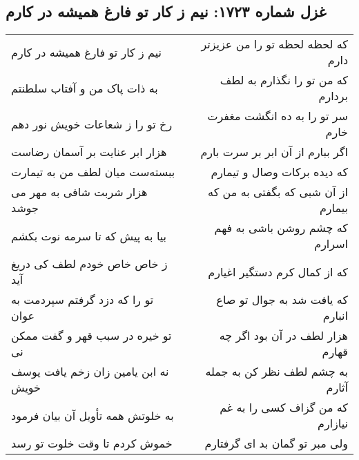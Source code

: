 \begin{center}
\section*{غزل شماره ۱۷۲۳: نیم ز کار تو فارغ همیشه در کارم}
\label{sec:1723}
\begin{longtable}{l p{0.5cm} r}
نیم ز کار تو فارغ همیشه در کارم
&&
که لحظه لحظه تو را من عزیزتر دارم
\\
به ذات پاک من و آفتاب سلطنتم
&&
که من تو را نگذارم به لطف بردارم
\\
رخ تو را ز شعاعات خویش نور دهم
&&
سر تو را به ده انگشت مغفرت خارم
\\
هزار ابر عنایت بر آسمان رضاست
&&
اگر ببارم از آن ابر بر سرت بارم
\\
ببسته‌ست میان لطف من به تیمارت
&&
که دیده برکات وصال و تیمارم
\\
هزار شربت شافی به مهر می جوشد
&&
از آن شبی که بگفتی به من که بیمارم
\\
بیا به پیش که تا سرمه نوت بکشم
&&
که چشم روشن باشی به فهم اسرارم
\\
ز خاص خاص خودم لطف کی دریغ آید
&&
که از کمال کرم دستگیر اغیارم
\\
تو را که دزد گرفتم سپردمت به عوان
&&
که یافت شد به جوال تو صاع انبارم
\\
تو خیره در سبب قهر و گفت ممکن نی
&&
هزار لطف در آن بود اگر چه قهارم
\\
نه ابن یامین زان زخم یافت یوسف خویش
&&
به چشم لطف نظر کن به جمله آثارم
\\
به خلوتش همه تأویل آن بیان فرمود
&&
که من گزاف کسی را به غم نیازارم
\\
خموش کردم تا وقت خلوت تو رسد
&&
ولی مبر تو گمان بد ای گرفتارم
\\
\end{longtable}
\end{center}

